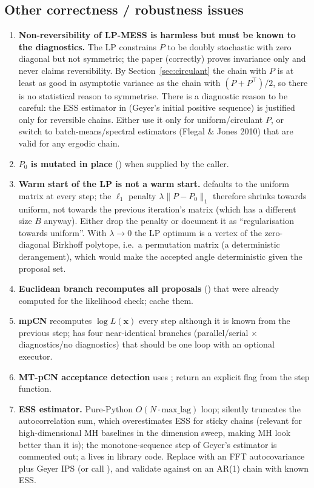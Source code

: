 \documentclass[11pt,a4paper]{article}
\theoremstyle{remark}
\newcommand{\bx}{\bm{x}}
\begin{document}
\subsection{Other correctness / robustness issues}
\begin{enumerate}[leftmargin=*]
\item \textbf{Non-reversibility of LP-MESS is harmless but must be known to the diagnostics.} The LP constrains $P$ to be doubly stochastic with zero diagonal but not symmetric; the paper (correctly) proves invariance only and never claims reversibility. By Section~\ref{sec:circulant} the chain with $P$ is at least as good in asymptotic variance as the chain with $(P+P^\top)/2$, so there is no statistical reason to symmetrise. There is a diagnostic reason to be careful: the ESS estimator in  (Geyer's initial positive sequence) is justified only for reversible chains. Either use it only for uniform/circulant $P$, or switch to batch-means/spectral estimators (Flegal \& Jones 2010) that are valid for any ergodic chain.
\item \textbf{$P_0$ is mutated in place} () when supplied by the caller.
\item \textbf{Warm start of the LP is not a warm start.}  defaults to the uniform matrix at every step; the $\ell_1$ penalty $\lambda\|P-P_0\|_1$ therefore shrinks towards uniform, not towards the previous iteration's matrix (which has a different size $B$ anyway). Either drop the penalty or document it as ``regularisation towards uniform''. With $\lambda\to0$ the LP optimum is a vertex of the zero-diagonal Birkhoff polytope, i.e.\ a permutation matrix (a deterministic derangement), which would make the accepted angle deterministic given the proposal set.
\item \textbf{Euclidean branch recomputes all proposals} () that were already computed for the likelihood check; cache them.
\item \textbf{mpCN} recomputes $\log L(\bx)$ every step although it is known from the previous step;  has four near-identical branches (parallel/serial $\times$ diagnostics/no diagnostics) that should be one loop with an optional executor.
\item \textbf{MT-pCN acceptance detection} uses ; return an explicit flag from the step function.
\item \textbf{ESS estimator.} Pure-Python $O(N\cdot\text{max\_lag})$ loop;  silently truncates the autocorrelation sum, which overestimates ESS for sticky chains (relevant for high-dimensional MH baselines in the dimension sweep, making MH look better than it is); the monotone-sequence step of Geyer's estimator is commented out; a  lives in library code. Replace with an FFT autocovariance plus Geyer IPS (or call ), and validate against  on an AR(1) chain with known ESS.

\end{enumerate}
\end{document}
